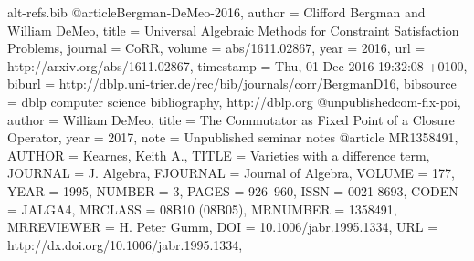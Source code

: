 \begin{filecontents*}{alt-refs.bib}
@article{Bergman-DeMeo-2016,
  author    = {Clifford Bergman and William DeMeo},
  title     = {Universal Algebraic Methods for Constraint Satisfaction Problems},
  journal   = {CoRR},
  volume    = {abs/1611.02867},
  year      = {2016},
  url       = {http://arxiv.org/abs/1611.02867},
  timestamp = {Thu, 01 Dec 2016 19:32:08 +0100},
  biburl    = {http://dblp.uni-trier.de/rec/bib/journals/corr/BergmanD16},
  bibsource = {dblp computer science bibliography, http://dblp.org}
}
@unpublished{com-fix-poi,
  author    = {William DeMeo},
  title     = {The Commutator as Fixed Point of a Closure Operator},
  year      = {2017},
  note = {Unpublished seminar notes}
}
@article {MR1358491,
    AUTHOR = {Kearnes, Keith A.},
     TITLE = {Varieties with a difference term},
   JOURNAL = {J. Algebra},
  FJOURNAL = {Journal of Algebra},
    VOLUME = {177},
      YEAR = {1995},
    NUMBER = {3},
     PAGES = {926--960},
      ISSN = {0021-8693},
     CODEN = {JALGA4},
   MRCLASS = {08B10 (08B05)},
  MRNUMBER = {1358491},
MRREVIEWER = {H. Peter Gumm},
       DOI = {10.1006/jabr.1995.1334},
       URL = {http://dx.doi.org/10.1006/jabr.1995.1334},
}
\end{filecontents*}
\documentclass[12pt,reqno]{amsart}

